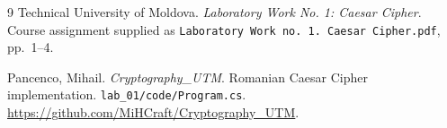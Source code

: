 \begin{thebibliography}{9}
\singlespace\normalsize
{}
Technical University of Moldova.
\textit{Laboratory Work No. 1: Caesar Cipher}.
Course assignment supplied as
\texttt{Laboratory Work no. 1. Caesar Cipher.pdf}, pp.~1--4.

Pancenco, Mihail.
\textit{Cryptography\_UTM}. Romanian Caesar Cipher implementation.
\texttt{lab\_01/code/Program.cs}.
\url{https://github.com/MiHCraft/Cryptography_UTM}.
\end{thebibliography}
